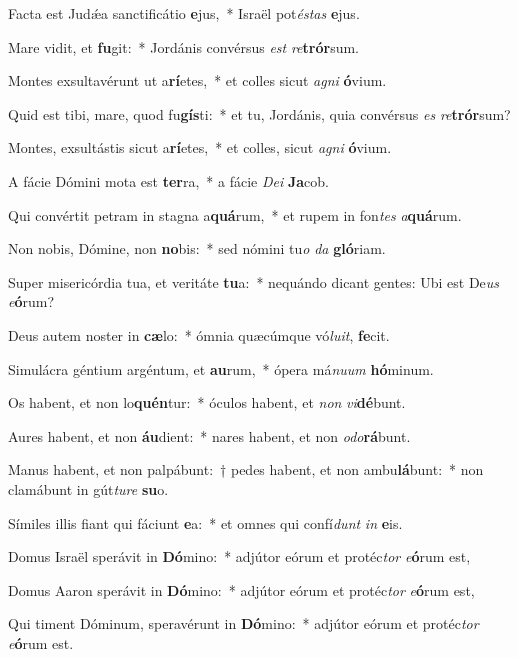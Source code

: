 \item Facta est Judǽa sanctificátio \textbf{e}jus,~* Israël pot\textit{és}\textit{tas} \textbf{e}jus.
\item Mare vidit, et \textbf{fu}git:~* Jordánis convérsus \textit{est} \textit{re}\textbf{trór}sum.
\item Montes exsultavérunt ut a\textbf{rí}etes,~* et colles sicut \textit{a}\textit{gni} \textbf{ó}vium.
\item Quid est tibi, mare, quod fu\textbf{gís}ti:~* et tu, Jordánis, quia convérsus \textit{es} \textit{re}\textbf{trór}sum?
\item Montes, exsultástis sicut a\textbf{rí}etes,~* et colles, sicut \textit{a}\textit{gni} \textbf{ó}vium.
\item A fácie Dómini mota est \textbf{ter}ra,~* a fácie \textit{De}\textit{i} \textbf{Ja}cob.
\item Qui convértit petram in stagna a\textbf{quá}rum,~* et rupem in fon\textit{tes} \textit{a}\textbf{quá}rum.
\item Non nobis, Dómine, non \textbf{no}bis:~* sed nómini tu\textit{o} \textit{da} \textbf{gló}riam.
\item Super misericórdia tua, et veritáte \textbf{tu}a:~* nequándo dicant gentes: Ubi est De\textit{us} \textit{e}\textbf{ó}rum?
\item Deus autem noster in \textbf{cæ}lo:~* ómnia quæcúmque vó\textit{lu}\textit{it}, \textbf{fe}cit.
\item Simulácra géntium argéntum, et \textbf{au}rum,~* ópera má\textit{nu}\textit{um} \textbf{hó}minum.
\item Os habent, et non lo\textbf{quén}tur:~* óculos habent, et \textit{non} \textit{vi}\textbf{dé}bunt.
\item Aures habent, et non \textbf{áu}dient:~* nares habent, et non \textit{o}\textit{do}\textbf{rá}bunt.
\item Manus habent, et non palpábunt:~† pedes habent, et non ambu\textbf{lá}bunt:~* non clamábunt in gút\textit{tu}\textit{re} \textbf{su}o.
\item Símiles illis fiant qui fáciunt \textbf{e}a:~* et omnes qui confí\textit{dunt} \textit{in} \textbf{e}is.
\item Domus Israël sperávit in \textbf{Dó}mino:~* adjútor eórum et protéc\textit{tor} \textit{e}\textbf{ó}rum est,
\item Domus Aaron sperávit in \textbf{Dó}mino:~* adjútor eórum et protéc\textit{tor} \textit{e}\textbf{ó}rum est,
\item Qui timent Dóminum, speravérunt in \textbf{Dó}mino:~* adjútor eórum et protéc\textit{tor} \textit{e}\textbf{ó}rum est.
